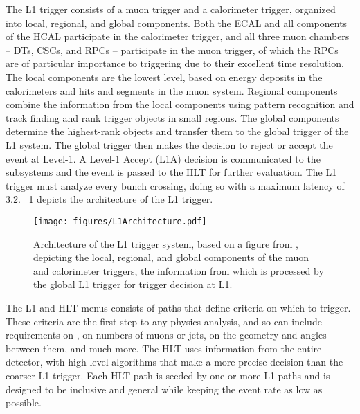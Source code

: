 The L1 trigger consists of a muon trigger and a calorimeter trigger, organized into local, regional, and global components.
Both the ECAL and all components of the HCAL participate in the calorimeter trigger, and all three muon chambers -- DTs, CSCs, and RPCs -- participate in the muon trigger, of which the RPCs are of particular importance to triggering due to their excellent time resolution.
The local components are the lowest level, based on energy deposits in the calorimeters and hits and segments in the muon system.
Regional components combine the information from the local components using pattern recognition and track finding and rank trigger objects in small regions.
The global components determine the highest-rank objects and transfer them to the global trigger of the L1 system.
The global trigger then makes the decision to reject or accept the event at Level-1.
A Level-1 Accept (L1A) decision is communicated to the subsystems and the event is passed to the HLT for further evaluation.
The L1 trigger must analyze every bunch crossing, doing so with a maximum latency of 3.2\mus.
\Fig~\ref{cms:L1} depicts the architecture of the L1 trigger.

\begin{figure}[tpb]
  \centering
  \texttt{[image: figures/L1Architecture.pdf]}
  \caption{Architecture of the L1 trigger system, based on a figure from \cite{Chatrchyan:2008zzk}, depicting the local, regional, and global components of the muon and calorimeter triggers, the information from which is processed by the global L1 trigger for trigger decision at L1.}
  \label{cms:L1}
\end{figure}

The L1 and HLT menus consists of paths that define criteria on which to trigger.
These criteria are the first step to any physics analysis, and so can include requirements on \pT, on numbers of muons or jets, on the geometry and angles between them, and much more.
The HLT uses information from the entire detector, with high-level algorithms that make a more precise decision than the coarser L1 trigger.
Each HLT path is seeded by one or more L1 paths and is designed to be inclusive and general while keeping the event rate as low as possible.
